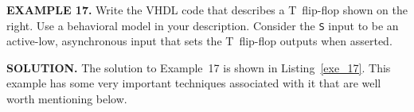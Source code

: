 \begin{leftbar}
\begin{minipage}{0.5\linewidth}
\noindent
\textbf{EXAMPLE 17.}
Write the VHDL code that describes a T~flip-flop shown on the right. Use a behavioral model in your description. Consider the \texttt{S} input to be an active-low, asynchronous input that sets the T~flip-flop outputs when asserted.
\end{minipage}
\begin{minipage}{0.47\linewidth}
\begin{flushright}
\end{flushright}
\end{minipage}
\end{leftbar}
\noindent
\textbf{SOLUTION.} The solution to Example~17 is shown in Listing~\ref{exe_17}. This example has some very important techniques associated with it that are well worth mentioning below.
